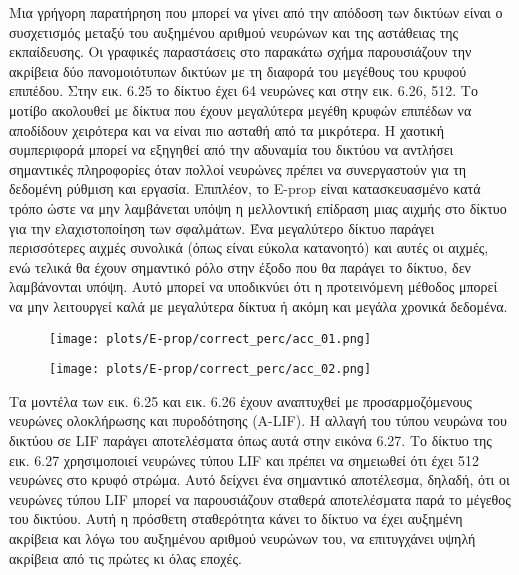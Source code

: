 \documentclass[12pt]{report}
\begin{document}
Μια γρήγορη παρατήρηση που μπορεί να γίνει από την απόδοση των δικτύων είναι ο συσχετισμός μεταξύ του αυξημένου αριθμού νευρώνων και της αστάθειας της εκπαίδευσης. Οι γραφικές παραστάσεις στο παρακάτω σχήμα παρουσιάζουν την ακρίβεια δύο πανομοιότυπων δικτύων με τη διαφορά του μεγέθους του κρυφού επιπέδου. Στην εικ. 6.25 το δίκτυο έχει 64 νευρώνες και στην εικ. 6.26, 512. Το μοτίβο ακολουθεί με δίκτυα που έχουν μεγαλύτερα μεγέθη κρυφών επιπέδων να αποδίδουν χειρότερα και να είναι πιο ασταθή από τα μικρότερα. Η χαοτική συμπεριφορά μπορεί να εξηγηθεί από την αδυναμία του δικτύου να αντλήσει σημαντικές πληροφορίες όταν πολλοί νευρώνες πρέπει να συνεργαστούν για τη δεδομένη ρύθμιση και εργασία. Επιπλέον, το \textlatin{E-prop} είναι κατασκευασμένο κατά τρόπο ώστε να μην λαμβάνεται υπόψη η μελλοντική επίδραση μιας αιχμής στο δίκτυο για την ελαχιστοποίηση των σφαλμάτων. Ένα μεγαλύτερο δίκτυο παράγει περισσότερες αιχμές συνολικά (όπως είναι εύκολα κατανοητό) και αυτές οι αιχμές, ενώ τελικά θα έχουν σημαντικό ρόλο στην έξοδο που θα παράγει το δίκτυο, δεν λαμβάνονται υπόψη. Αυτό μπορεί να υποδικνύει ότι η προτεινόμενη μέθοδος μπορεί να μην λειτουργεί καλά με μεγαλύτερα δίκτυα ή ακόμη και μεγάλα χρονικά δεδομένα.

\begin{figure}
\centering
\begin{minipage}{.4\textwidth}
  \centering
  \texttt{[image: plots/E-prop/correct\_perc/acc\_01.png]}
  \label{fig:test1}
\end{minipage}
\begin{minipage}{.4\textwidth}
  \centering
  \texttt{[image: plots/E-prop/correct\_perc/acc\_02.png]}
  \label{fig:test2}
\end{minipage}
\end{figure}

Τα μοντέλα των εικ. 6.25 και εικ. 6.26 έχουν αναπτυχθεί με προσαρμοζόμενους νευρώνες ολοκλήρωσης και πυροδότησης (\textlatin{A-LIF}). Η αλλαγή του τύπου νευρώνα του δικτύου σε \textlatin{LIF} παράγει αποτελέσματα όπως αυτά στην εικόνα 6.27. Το δίκτυο της εικ. 6.27 χρησιμοποιεί νευρώνες τύπου \textlatin{LIF} και πρέπει να σημειωθεί ότι έχει 512 νευρώνες στο κρυφό στρώμα. Αυτό δείχνει ένα σημαντικό αποτέλεσμα, δηλαδή, ότι οι νευρώνες τύπου \textlatin{LIF} μπορεί να παρουσιάζουν σταθερά αποτελέσματα παρά το μέγεθος του δικτύου. Αυτή η πρόσθετη σταθερότητα κάνει το δίκτυο να έχει αυξημένη ακρίβεια και λόγω του αυξημένου αριθμού νευρώνων του, να επιτυγχάνει υψηλή ακρίβεια από τις πρώτες κι όλας εποχές.
\end{document}
